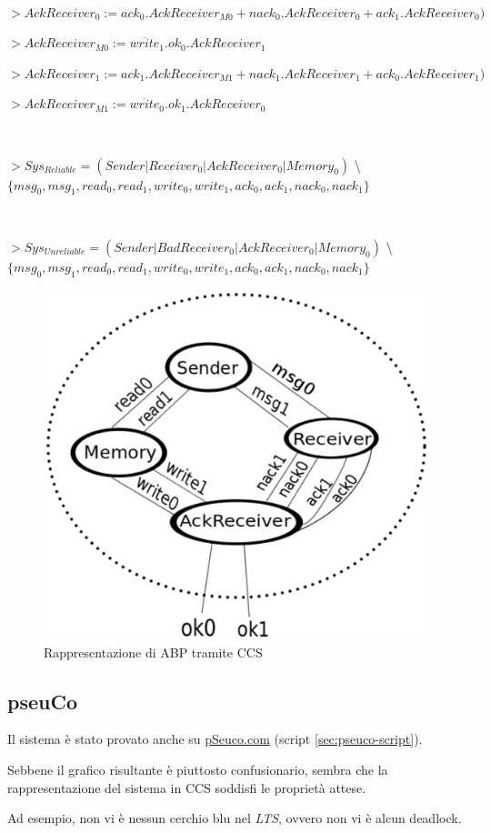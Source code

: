 $ $

$ > AckReceiver_0 := ack_0.AckReceiver_{M0} +
                     nack_0.AckReceiver_0 + ack_1.AckReceiver_0) $

$ > AckReceiver_{M0} := \overline{write}_1.ok_0.AckReceiver_1 $

$ > AckReceiver_1 := ack_1.AckReceiver_{M1} +
                     nack_1.AckReceiver_1 + ack_0.AckReceiver_1) $

$ > AckReceiver_{M1} := \overline{write}_0.ok_1.AckReceiver_0 $

$ $

$ > Sys_{Reliable} =  (Sender | Receiver_0 | AckReceiver_0 | Memory_0) $
  \textbackslash{} $ \{msg_0,msg_1,read_0,read_1,write_0,write_1,
                       ack_0,ack_1,nack_0,nack_1\} $

$ $

$ > Sys_{Unreliable} =  (Sender | BadReceiver_0 | AckReceiver_0 | Memory_0) $
  \textbackslash{} $ \{msg_0,msg_1,read_0,read_1,write_0,write_1,
                       ack_0,ack_1,nack_0,nack_1\} $

\begin{figure}[H]
  \centering
  \includegraphics[width=.5\columnwidth]{images/ccs.eps}
  \caption{Rappresentazione di ABP tramite CCS}
  \label{fig:ccs-abp}
\end{figure}

\subsection{pseuCo}

Il sistema è stato provato anche su \url{pSeuco.com} (script
\ref{sec:pseuco-script}). 

Sebbene il grafico risultante è piuttosto confusionario, sembra che la
rappresentazione del sistema in CCS soddisfi le proprietà attese.

Ad esempio, non vi è nessun cerchio blu nel \emph{LTS}, ovvero non vi è alcun
deadlock.


